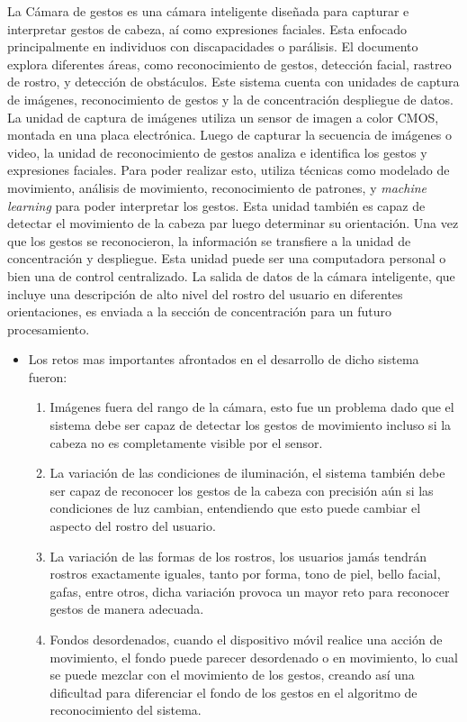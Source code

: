 La Cámara de gestos es una cámara inteligente diseñada para capturar e interpretar gestos de cabeza, aí como expresiones faciales. Esta enfocado principalmente en individuos con discapacidades o parálisis. El documento explora diferentes áreas, como reconocimiento de gestos, detección facial, rastreo de rostro, y detección de obstáculos. Este sistema cuenta con unidades de captura de imágenes, reconocimiento de gestos y la de concentración despliegue de datos. La unidad de captura de imágenes utiliza un sensor de imagen a color CMOS, montada en una placa electrónica. Luego de capturar la secuencia de imágenes o video, la unidad de reconocimiento de gestos analiza e identifica los gestos y expresiones faciales. Para poder realizar esto, utiliza técnicas como modelado de movimiento, análisis de movimiento, reconocimiento de patrones, y \textit{machine learning} para poder interpretar los gestos. Esta unidad también es capaz de detectar el movimiento de la cabeza par luego determinar su orientación. Una vez que los gestos se reconocieron, la información se transfiere a la unidad de concentración y despliegue. Esta unidad puede ser una computadora personal o bien una de control centralizado. La salida de datos de la cámara inteligente, que incluye una descripción de alto nivel del rostro del usuario en diferentes orientaciones, es enviada a la sección de concentración para un futuro procesamiento. \cite{Bankar2015}


\begin{itemize}
	\item Los retos mas importantes afrontados en el desarrollo de dicho sistema fueron:
	\begin{enumerate}
		\item Imágenes fuera del rango de la cámara, esto fue un problema dado que el sistema debe ser capaz de detectar los gestos de movimiento incluso si la cabeza no es completamente visible por el sensor. \cite{Bankar2015}
		\item La variación de las condiciones de iluminación, el sistema también debe ser capaz de reconocer los gestos de la cabeza con precisión aún si las condiciones de luz cambian, entendiendo que esto puede cambiar el aspecto del rostro del usuario. \cite{Bankar2015}
		\item La variación de las formas de los rostros, los usuarios jamás tendrán rostros exactamente iguales, tanto por forma, tono de piel, bello facial, gafas, entre otros, dicha variación provoca un mayor reto para reconocer gestos de manera adecuada. \cite{Bankar2015}
		\item Fondos desordenados, cuando el dispositivo móvil realice una acción de movimiento, el fondo puede parecer desordenado o en movimiento, lo cual se puede mezclar con el movimiento de los gestos, creando así una dificultad para diferenciar el fondo de los gestos en el algoritmo de reconocimiento del sistema. \cite{Bankar2015}
	\end{enumerate}
\end{itemize}

